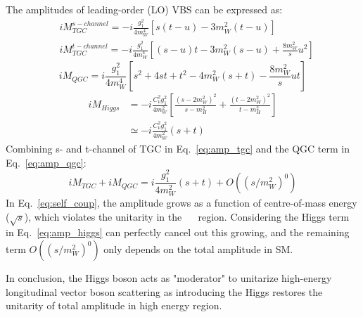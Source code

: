The amplitudes of leading-order (LO) VBS can be expressed as\cite{PhysRevD.87.093005}:
\begin{equation} \label{eq:amp_tgc}
\begin{split}
	& {iM}_{TGC}^{s-channel} = -i\frac{g_{1}^{2}}{4m_{W}^{4}}[s(t-u)-3m_{W}^{2}(t-u)] \\
	& {iM}_{TGC}^{t-channel} = -i\frac{g_{1}^{2}}{4m_{W}^{4}}\left[(s-u)t-3m_{W}^{2}(s-u)+\frac{8m_{W}^{2}}{s}u^{2}\right]
\end{split}
\end{equation}
\begin{equation} \label{eq:amp_qgc}
	{iM}_{QGC} = i\frac{g_{1}^{2}}{4m_{W}^{4}}\left[s^{2}+4st+t^{2}-4m_{W}^{2}(s+t)-\frac{8m_{W}^{2}}{s}ut\right]
\end{equation}
\begin{equation} \label{eq:amp_higgs}
\begin{split}
	{iM}_{Higgs} & = -i\frac{C_{\nu}^{2}g_{1}^{2}}{4m_{W}^{2}}\left[\frac{(s-2m_{W}^{2})^{2}}{s-m_{H}^{2}} + \frac{(t-2m_{W}^{2})^{2}}{t-m_{H}^{2}}\right] \\
                     & \simeq -i\frac{C_{\nu}^{2}g_{1}^{2}}{4m_{W}^{2}}(s+t)
\end{split}
\end{equation}
Combining s- and t-channel of TGC in Eq.~\ref{eq:amp_tgc} and the QGC term in Eq.~\ref{eq:amp_qgc}:
\begin{equation} \label{eq:self_coup}
	{iM}_{TGC} + {iM}_{QGC}= i\frac{g_{1}^{2}}{4m_{W}^{2}}(s+t) + {O}((s/m_{W}^{2})^{0})
\end{equation}
In Eq.~\ref{eq:self_coup}, the amplitude grows as a function of centre-of-mass energy ($\sqrt{s}$),
which violates the unitarity in the ~\tev~ region.
Considering the Higgs term in Eq.~\ref{eq:amp_higgs} can perfectly cancel out this growing,
and the remaining term ${O}((s/m_{W}^{2})^{0})$ only depends on the total amplitude in SM.

In conclusion, the Higgs boson acts as "moderator" to unitarize high-energy longitudinal vector boson scattering
as introducing the Higgs restores the unitarity of total amplitude in high energy region.
